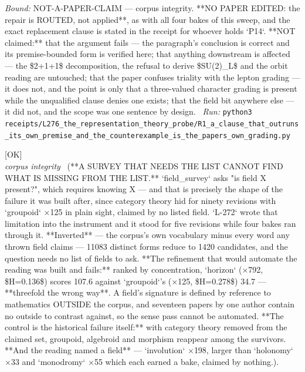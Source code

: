 \begin{description}
 \emph{Bound:} NOT-A-PAPER-CLAIM --- corpus integrity. **NO PAPER EDITED: the repair is ROUTED, not applied**, as with all four bakes of this sweep, and the exact replacement clause is stated in the receipt for whoever holds `P14`. **NOT claimed:** that the argument fails --- the paragraph's conclusion is correct and its premise-bounded form is verified here; that anything downstream is affected --- the \$2+1+1\$ decomposition, the refusal to derive \$SU(2)\_L\$ and the orbit reading are untouched; that the paper confuses triality with the lepton grading --- it does not, and the point is only that a three-valued character grading is present while the unqualified clause denies one exists; that the field bit anywhere else --- it did not, and the scope was one sentence by design.
\ \emph{Run:} \texttt{python3 receipts/L276\_the\_representation\_theory\_probe/R1\_a\_clause\_that\_outruns\_its\_own\_premise\_and\_the\_counterexample\_is\_the\_papers\_own\_grading.py}
\item[\label{rcpt:U1_a_survey_that_needs_the_list_cannot_find_what_is_missing_from_the_list}\texttt{U1\_a\_survey\_that\_needs\_the\_list\_cannot\_find\_what\_is\_missing\_from\_the\_list}]\hfill\textsf{[OK]}\\
\textit{corpus integrity} \ (**A SURVEY THAT NEEDS THE LIST CANNOT FIND WHAT IS MISSING FROM THE LIST.** `field\_survey` asks "is field X present?", which requires knowing X --- and that is precisely the shape of the failure it was built after, since category theory hid for ninety revisions with `groupoid` \ensuremath{\times}125 in plain sight, claimed by no listed field. `L-272` wrote that limitation into the instrument and it stood for five revisions while four bakes ran through it. **Inverted** --- the corpus's own vocabulary minus every word any thrown field claims --- 11083 distinct forms reduce to 1420 candidates, and the question needs no list of fields to ask. **The refinement that would automate the reading was built and fails:** ranked by concentration, `horizon` (\ensuremath{\times}792, \$H=0.136\$) scores 107.6 against `groupoid`'s (\ensuremath{\times}125, \$H=0.278\$) 34.7 --- **threefold the wrong way**. A field's signature is defined by reference to mathematics OUTSIDE the corpus, and seventeen papers by one author contain no outside to contrast against, so the sense pass cannot be automated. **The control is the historical failure itself:** with category theory removed from the claimed set, groupoid, algebroid and morphism reappear among the survivors. **And the reading named a field** --- `involution` \ensuremath{\times}198, larger than `holonomy` \ensuremath{\times}33 and `monodromy` \ensuremath{\times}55 which each earned a bake, claimed by nothing.). 

\end{description}
